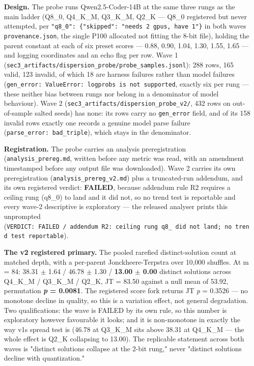 \textbf{Design.} The probe runs Qwen2.5-Coder-14B at the same three rungs as the main ladder (Q8\_0, Q4\_K\_M, Q3\_K\_M, Q2\_K --- Q8\_0 registered but never attempted, per \texttt{"q8\_0":\ \{"skipped":\ "needs\ 2\ gpus,\ have\ 1"\}} in both waves\textquotesingle{} \texttt{provenance.json}, the single P100 allocated not fitting the 8-bit file), holding the parent constant at each of six preset scores --- 0.88, 0.90, 1.04, 1.30, 1.55, 1.65 --- and logging coordinates and an echo flag per row. Wave 1 (\texttt{sec3\_\allowbreak artifacts/\allowbreak dispersion\_\allowbreak probe/\allowbreak probe\_\allowbreak samples.jsonl}): 288 rows, 165 valid, 123 invalid, of which 18 are harness failures rather than model failures (\texttt{gen\_\allowbreak error:\ ValueError:\ logprobs\ is\ not\ supported}, exactly six per rung --- these neither bias between rungs nor belong in a denominator of model behaviour). Wave 2 (\texttt{sec3\_artifacts/dispersion\_probe\_v2/}, 432 rows on out-of-sample salted seeds) has none: its rows carry no \texttt{gen\_error} field, and of its 158 invalid rows exactly one records a genuine model parse failure (\texttt{parse\_error:\ bad\_triple}), which stays in the denominator.

\textbf{Registration.} The probe carries an analysis preregistration (\texttt{analysis\_prereg.md}, written before any metric was read, with an amendment timestamped before any output file was downloaded). Wave 2 carries its own preregistration (\texttt{analysis\_prereg\_v2.md}) plus a truncated-run addendum, and its own registered verdict: \textbf{FAILED}, because addendum rule R2 requires a ceiling rung (q8\_0) to land and it did not, so no trend test is reportable and every wave-2 descriptive is exploratory --- the released analyser prints this unprompted (\texttt{VERDICT:\ FAILED\ /\allowbreak \ addendum\ R2:\ ceiling\ rung\ q8\_\ did\ not\ land;\ no\ trend\ test\ reportable}).

\textbf{The v2 registered primary.} The pooled rarefied distinct-solution count at matched depth, with a per-parent Jonckheere-Terpstra over 10,000 shuffles. At m = 84: 38.31 \(\pm\) 1.64 / 46.78 \(\pm\) 1.30 / \textbf{13.00 \(\pm\) 0.00} distinct solutions across Q4\_K\_M / Q3\_K\_M / Q2\_K, JT = 83.50 against a null mean of 53.92, permutation \textbf{\emph{p} = 0.0081}. The registered score fork returns JT \emph{p} = 0.3526 --- no monotone decline in quality, so this is a variation effect, not general degradation. Two qualifications: the wave is FAILED by its own rule, so this number is exploratory however favourable it looks; and it is non-monotone in exactly the way v1\textquotesingle s spread test is (46.78 at Q3\_K\_M sits above 38.31 at Q4\_K\_M --- the whole effect is Q2\_K collapsing to 13.00). The replicable statement across both waves is "distinct solutions collapse at the 2-bit rung," never "distinct solutions decline with quantization."

